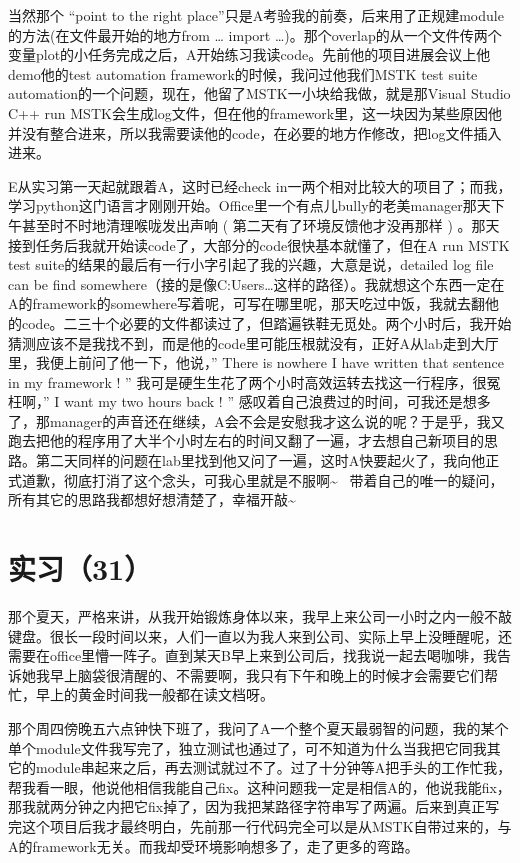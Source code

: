 \documentclass[12pt]{book}
\begin{document}
当然那个 “point to the right place”只是A考验我的前奏，后来用了正规建module的方法(在文件最开始的地方from … import …)。那个overlap的从一个文件传两个变量plot的小任务完成之后，A开始练习我读code。先前他的项目进展会议上他demo他的test automation framework的时候，我问过他我们MSTK test suite automation的一个问题，现在，他留了MSTK一小块给我做，就是那Visual Studio C++ run MSTK会生成log文件，但在他的framework里，这一块因为某些原因他并没有整合进来，所以我需要读他的code，在必要的地方作修改，把log文件插入进来。

E从实习第一天起就跟着A，这时已经check in一两个相对比较大的项目了；而我，学习python这门语言才刚刚开始。Office里一个有点儿bully的老美manager那天下午甚至时不时地清理喉咙发出声响 ( 第二天有了环境反馈他才没再那样 ) 。那天接到任务后我就开始读code了，大部分的code很快基本就懂了，但在A run MSTK test suite的结果的最后有一行小字引起了我的兴趣，大意是说，detailed log file can be find somewhere（接的是像C:Users\ldots{}这样的路径）。我就想这个东西一定在A的framework的somewhere写着呢，可写在哪里呢，那天吃过中饭，我就去翻他的code。二三十个必要的文件都读过了，但踏遍铁鞋无觅处。两个小时后，我开始猜测应该不是我找不到，而是他的code里可能压根就没有，正好A从lab走到大厅里，我便上前问了他一下，他说，” There is nowhere I have written that sentence in my framework ! ” 我可是硬生生花了两个小时高效运转去找这一行程序，很冤枉啊，” I want my two hours back ! ” 感叹着自己浪费过的时间，可我还是想多了，那manager的声音还在继续，A会不会是安慰我才这么说的呢？于是乎，我又跑去把他的程序用了大半个小时左右的时间又翻了一遍，才去想自己新项目的思路。第二天同样的问题在lab里找到他又问了一遍，这时A快要起火了，我向他正式道歉，彻底打消了这个念头，可我心里就是不服啊\textasciitilde{}~ 带着自己的唯一的疑问，所有其它的思路我都想好想清楚了，幸福开敲\textasciitilde{}~ 

\section{实习（31）}
\label{sec-5-34}

那个夏天，严格来讲，从我开始锻炼身体以来，我早上来公司一小时之内一般不敲键盘。很长一段时间以来，人们一直以为我人来到公司、实际上早上没睡醒呢，还需要在office里懵一阵子。直到某天B早上来到公司后，找我说一起去喝咖啡，我告诉她我早上脑袋很清醒的、不需要啊，我只有下午和晚上的时候才会需要它们帮忙，早上的黄金时间我一般都在读文档呀。

那个周四傍晚五六点钟快下班了，我问了A一个整个夏天最弱智的问题，我的某个单个module文件我写完了，独立测试也通过了，可不知道为什么当我把它同我其它的module串起来之后，再去测试就过不了。过了十分钟等A把手头的工作忙我，帮我看一眼，他说他相信我能自己fix。这种问题我一定是相信A的，他说我能fix，那我就两分钟之内把它fix掉了，因为我把某路径字符串写了两遍。后来到真正写完这个项目后我才最终明白，先前那一行代码完全可以是从MSTK自带过来的，与A的framework无关。而我却受环境影响想多了，走了更多的弯路。
\end{document}
